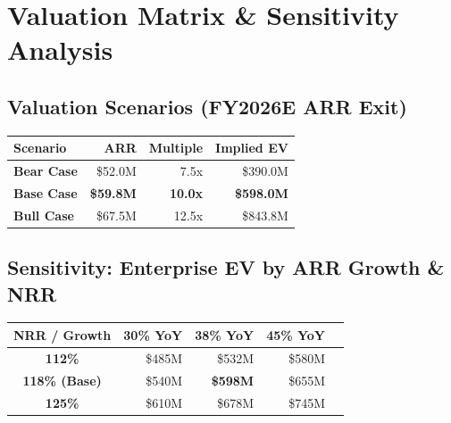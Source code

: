 \documentclass[10pt,a4paper]{article}
\begin{document}
\vspace{12pt}

\section{Valuation Matrix \& Sensitivity Analysis}

\noindent
\begin{minipage}[t]{0.48\textwidth}
  \subsection{Valuation Scenarios (FY2026E ARR Exit)}
  \vspace{-2pt}
  \begin{tcolorbox}[tablebox]
    \small
    \begin{tabularx}{\textwidth}{X r r r}
      \toprule
      \textbf{Scenario} & \textbf{ARR} & \textbf{Multiple} & \textbf{Implied EV} \\
      \midrule
      \textbf{Bear Case} & \$52.0M & 7.5x & \$390.0M \\
      \textbf{Base Case} & \textbf{\$59.8M} & \textbf{10.0x} & \textbf{\$598.0M} \\
      \textbf{Bull Case} & \$67.5M & 12.5x & \$843.8M \\
      \bottomrule
    \end{tabularx}
  \end{tcolorbox}
\end{minipage}%
\hfill
\begin{minipage}[t]{0.49\textwidth}
  \subsection{Sensitivity: Enterprise EV by ARR Growth \& NRR}
  \vspace{-2pt}
  \begin{tcolorbox}[tablebox]
    \small
    \begin{tabularx}{\textwidth}{c r r r r}
      \toprule
      \textbf{NRR / Growth} & \textbf{30\% YoY} & \textbf{38\% YoY} & \textbf{45\% YoY} \\
      \midrule
      \textbf{112\%} & \$485M & \$532M & \$580M \\
      \textbf{118\% (Base)} & \$540M & \textbf{\$598M} & \$655M \\
      \textbf{125\%} & \$610M & \$678M & \$745M \\
      \bottomrule
    \end{tabularx}
  \end{tcolorbox}
\end{minipage}
\end{document}
